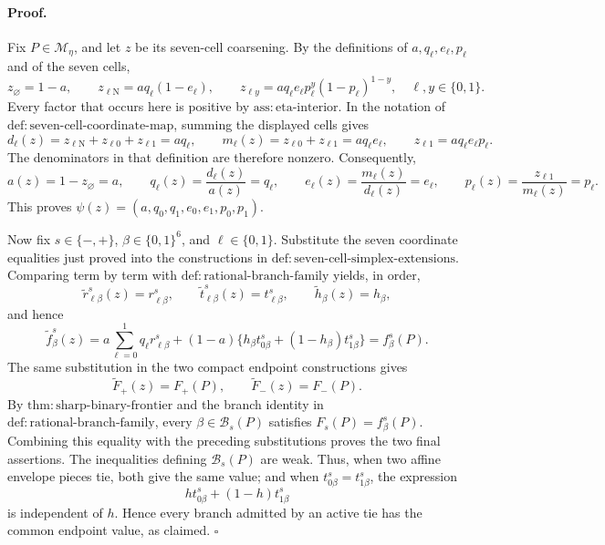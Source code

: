 \paragraph{Proof.}
Fix \(P\in\mathcal M_\eta\), and let \(z\) be its seven-cell coarsening.  By the definitions of \(a,q_\ell,e_\ell,p_\ell\) and of the seven cells,
\[
 z_\varnothing=1-a,
 \qquad
 z_{\ell\mathrm N}=a q_\ell(1-e_\ell),
 \qquad
 z_{\ell y}=a q_\ell e_\ell p_\ell^y(1-p_\ell)^{1-y},
 \quad \ell,y\in\{0,1\}.
\]
Every factor that occurs here is positive by \(\mathrm{ass{:}eta\text{-}interior}\).  In the notation of \(\mathrm{def{:}seven\text{-}cell\text{-}coordinate\text{-}map}\), summing the displayed cells gives
\[
 d_\ell(z)=z_{\ell\mathrm N}+z_{\ell0}+z_{\ell1}=a q_\ell,
 \qquad
 m_\ell(z)=z_{\ell0}+z_{\ell1}=a q_\ell e_\ell,
 \qquad
 z_{\ell1}=a q_\ell e_\ell p_\ell.
\]
The denominators in that definition are therefore nonzero.  Consequently,
\[
 a(z)=1-z_\varnothing=a,
 \qquad
 q_\ell(z)=\frac{d_\ell(z)}{a(z)}=q_\ell,
 \qquad
 e_\ell(z)=\frac{m_\ell(z)}{d_\ell(z)}=e_\ell,
 \qquad
 p_\ell(z)=\frac{z_{\ell1}}{m_\ell(z)}=p_\ell.
\]
This proves \(\psi(z)=(a,q_0,q_1,e_0,e_1,p_0,p_1)\).

Now fix \(s\in\{-,+\}\), \(\beta\in\{0,1\}^6\), and \(\ell\in\{0,1\}\).  Substitute the seven coordinate equalities just proved into the constructions in \(\mathrm{def{:}seven\text{-}cell\text{-}simplex\text{-}extensions}\).  Comparing term by term with \(\mathrm{def{:}rational\text{-}branch\text{-}family}\) yields, in order,
\[
 \widetilde r_{\ell\beta}^s(z)=r_{\ell\beta}^s,
 \qquad
 \widetilde t_{\ell\beta}^s(z)=t_{\ell\beta}^s,
 \qquad
 \widetilde h_\beta(z)=h_\beta,
\]
and hence
\[
 \widetilde f_\beta^s(z)
 =a\sum_{\ell=0}^1q_\ell r_{\ell\beta}^s
 +(1-a)\{h_\beta t_{0\beta}^s+(1-h_\beta)t_{1\beta}^s\}
 =f_\beta^s(P).
\]
The same substitution in the two compact endpoint constructions gives
\[
 \widetilde F_+(z)=F_+(P),
 \qquad
 \widetilde F_-(z)=F_-(P).
\]
By \(\mathrm{thm{:}sharp\text{-}binary\text{-}frontier}\) and the branch identity in \(\mathrm{def{:}rational\text{-}branch\text{-}family}\), every \(\beta\in\mathcal B_s(P)\) satisfies \(F_s(P)=f_\beta^s(P)\).  Combining this equality with the preceding substitutions proves the two final assertions.  The inequalities defining \(\mathcal B_s(P)\) are weak.  Thus, when two affine envelope pieces tie, both give the same value; and when \(t_{0\beta}^s=t_{1\beta}^s\), the expression
\[
 h t_{0\beta}^s+(1-h)t_{1\beta}^s
\]
is independent of \(h\).  Hence every branch admitted by an active tie has the common endpoint value, as claimed. \(\square\)

